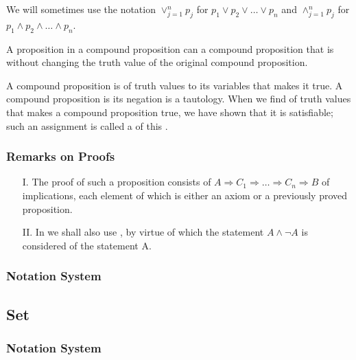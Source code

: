 We will sometimes use the notation $\vee^{n}_{j=1}p_j$ for 
$p_1 \vee p_2 \vee \dots \vee p_n$
and $\wedge^{n}_{j=1}p_j$ for
$p_1 \wedge p_2 \wedge \dots \wedge p_n$.

A proposition in a compound proposition can 
a compound proposition that is 
without changing the truth value of the original compound proposition.

A compound proposition is   
 of truth values to its variables
that makes it true.
A compound proposition is  
its negation is a tautology.
When we find  of truth values that makes a 
compound proposition true, we have shown that it is satisfiable; 
such an assignment is called a  of this 
.

\crule

\subsubsection{Remarks on Proofs} 

\begin{itemize}
  \item[I.] The proof of such a proposition consists of 
    $A \Rightarrow C_1 \Rightarrow \dots \Rightarrow C_n \Rightarrow B$
    of implications, each element of which is either an axiom or 
    a previously proved proposition.
  \item[II.] In  we shall also use 
    , by virtue of which the statement
    $A \wedge \neg{A}$ is considered  of the statement A.
\end{itemize}

\crule

\subsubsection{Notation System}

\subsection{Set}

\subsubsection{Notation System}

